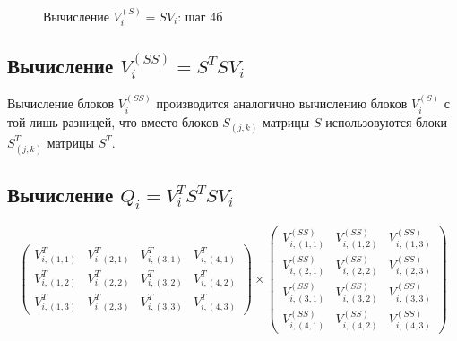 \begin{figure}
	\caption{Вычисление $V_i^{(S)} = S V_i$: шаг 4б}
	\label{figure:csmi:S_V_step_4b}
\end{figure}

\subsection{Вычисление $V_i^{(SS)} = S^T S V_i$}

Вычисление блоков $V_i^{(SS)}$ производится аналогично вычислению блоков $V_i^{(S)}$ с той лишь разницей, что вместо блоков $S_{(j,k)}$ матрицы $S$ использовуются блоки
$S_{(j,k)}^T$ матрицы $S^T$.

\subsection{Вычисление $Q_i = V_i^T S^T S V_i$}

$$
	\begin{pmatrix}
		V_{i,(1,1)}^T & V_{i,(2,1)}^T & V_{i,(3,1)}^T & V_{i,(4,1)}^T \\
		V_{i,(1,2)}^T & V_{i,(2,2)}^T & V_{i,(3,2)}^T & V_{i,(4,2)}^T \\
		V_{i,(1,3)}^T & V_{i,(2,3)}^T & V_{i,(3,3)}^T & V_{i,(4,3)}^T
	\end{pmatrix}
	\times
	\begin{pmatrix}
		V_{i,(1,1)}^{(SS)} & V_{i,(1,2)}^{(SS)} & V_{i,(1,3)}^{(SS)} \\
		V_{i,(2,1)}^{(SS)} & V_{i,(2,2)}^{(SS)} & V_{i,(2,3)}^{(SS)} \\
		V_{i,(3,1)}^{(SS)} & V_{i,(3,2)}^{(SS)} & V_{i,(3,3)}^{(SS)} \\
		V_{i,(4,1)}^{(SS)} & V_{i,(4,2)}^{(SS)} & V_{i,(4,3)}^{(SS)}
	\end{pmatrix}
$$

